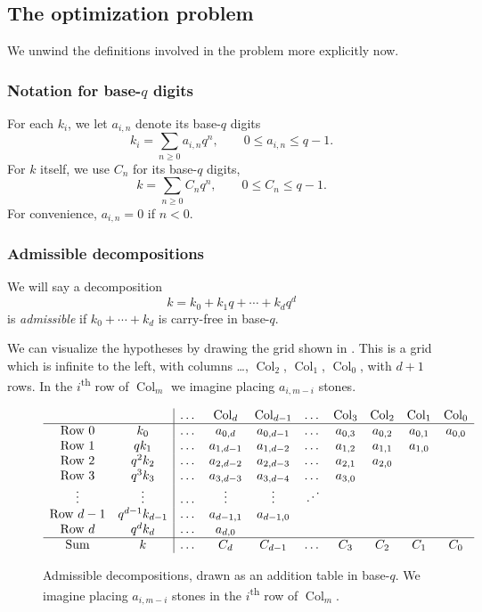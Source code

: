 \documentclass[11pt]{amsart}
\theoremstyle{definition}
\theoremstyle{remark}
\DeclareMathOperator{\Col}{Col}
\begin{document}
\subsection{The optimization problem}
We unwind the definitions involved in the problem more explicitly now.

\subsubsection{Notation for base-$q$ digits}
For each $k_i$, we let $a_{i,n}$ denote its base-$q$ digits
\[ k_i = \sum_{n\geq 0}a_{i,n}q^n, \qquad 0\leq a_{i,n}\leq q-1.  \]
For $k$ itself, we use $C_n$ for its base-$q$ digits,
\[ k = \sum_{n \ge 0} C_n q^n, \qquad 0 \le C_n \le q-1. \]
For convenience, $a_{i,n} = 0$ if $n < 0$.

\subsubsection{Admissible decompositions}
We will say a decomposition
\[ k=k_0+k_1q+\cdots+k_dq^d \]
is \emph{admissible} if $k_0+\cdots+k_d$ is carry-free in base-$q$.

We can visualize the hypotheses by drawing the grid shown in .
This is a grid which is infinite to the left,
with columns \dots, $\Col_2$, $\Col_1$, $\Col_0$, with $d+1$ rows.
In the $i$\textsuperscript{th} row of $\Col_m$ we imagine placing $a_{i,m-i}$ stones.
\begin{figure}[ht]
  \centering
  \[
    \begin{array}{cc|cccccccc}
      && \dots & \Col_{d} & \Col_{d-1} & \dots & \Col_3 & \Col_2 & \Col_1 & \Col_0 \\ \hline
      \text{Row $0$} & k_0 & \dots & a_{0,d} & a_{0,d-1} & \dots & a_{0,3} & a_{0,2} & a_{0,1} & a_{0,0} \\
      \text{Row $1$} & q k_1 & \dots & a_{1,d-1} & a_{1,d-2} & \dots & a_{1,2} & a_{1,1} & a_{1,0} \\
      \text{Row $2$} & q^2 k_2 & \dots & a_{2,d-2} & a_{2,d-3} & \dots & a_{2,1} & a_{2,0} \\
      \text{Row $3$} & q^3 k_3 & \dots & a_{3,d-3} & a_{3,d-4} & \dots & a_{3,0} \\
      \multicolumn{1}{c}{\vdots} & \vdots & \dots & \vdots & \vdots & \iddots \\
      \text{Row $d-1$} & q^{d-1} k_{d-1} & \dots & a_{d-1,1} & a_{d-1,0} \\
      \text{Row $d$} & q^d k_d & \dots & a_{d,0} \\ \hline
      \text{Sum} & k & \dots & C_d & C_{d-1} & \dots & C_3 & C_2 & C_1 & C_0
    \end{array}
  \]
  \caption{Admissible decompositions, drawn as an addition table in base-$q$.
    We imagine placing $a_{i,m-i}$ stones in the $i$\textsuperscript{th} row of $\Col_m$.}
  \label{fig:addition_table}
\end{figure}
\end{document}
